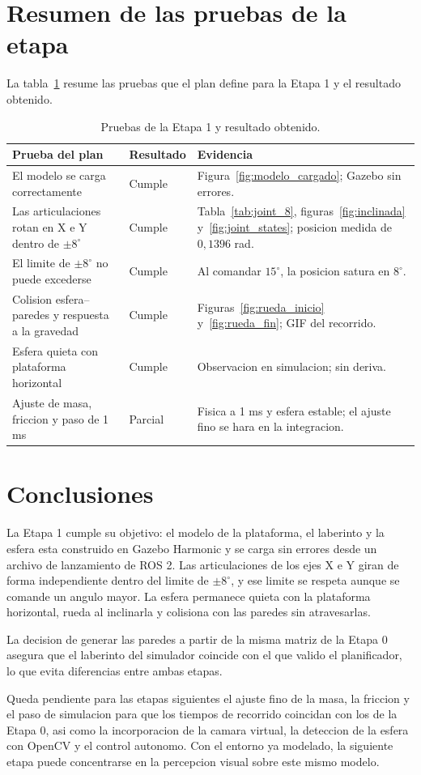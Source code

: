 \documentclass[11pt,a4paper]{article}
\begin{document}
\section{Resumen de las pruebas de la etapa}
La tabla~\ref{tab:pruebas} resume las pruebas que el plan define para la Etapa 1 y el resultado obtenido.
\begin{table}[H]
    \centering
    \begin{tabular}{@{}p{6.5cm}p{2cm}p{5.5cm}@{}}
        \toprule
        \textbf{Prueba del plan} & \textbf{Resultado} & \textbf{Evidencia} \\
        \midrule
        El modelo se carga correctamente & Cumple & Figura~\ref{fig:modelo_cargado}; Gazebo sin errores. \\
        Las articulaciones rotan en X e Y dentro de $\pm 8^\circ$ & Cumple & Tabla~\ref{tab:joint_8}, figuras~\ref{fig:inclinada} y~\ref{fig:joint_states}; posicion medida de $0{,}1396$ rad. \\
        El limite de $\pm 8^\circ$ no puede excederse & Cumple & Al comandar $15^\circ$, la posicion satura en $8^\circ$. \\
        Colision esfera--paredes y respuesta a la gravedad & Cumple & Figuras~\ref{fig:rueda_inicio} y~\ref{fig:rueda_fin}; GIF del recorrido. \\
        Esfera quieta con plataforma horizontal & Cumple & Observacion en simulacion; sin deriva. \\
        Ajuste de masa, friccion y paso de 1 ms & Parcial & Fisica a 1 ms y esfera estable; el ajuste fino se hara en la integracion. \\
        \bottomrule
    \end{tabular}
    \caption{Pruebas de la Etapa 1 y resultado obtenido.}
    \label{tab:pruebas}
\end{table}

\section{Conclusiones}
La Etapa 1 cumple su objetivo: el modelo de la plataforma, el laberinto y la esfera esta construido en Gazebo Harmonic y se carga sin errores desde un archivo de lanzamiento de ROS 2. Las articulaciones de los ejes X e Y giran de forma independiente dentro del limite de $\pm 8^\circ$, y ese limite se respeta aunque se comande un angulo mayor. La esfera permanece quieta con la plataforma horizontal, rueda al inclinarla y colisiona con las paredes sin atravesarlas.

La decision de generar las paredes a partir de la misma matriz de la Etapa 0 asegura que el laberinto del simulador coincide con el que valido el planificador, lo que evita diferencias entre ambas etapas.

Queda pendiente para las etapas siguientes el ajuste fino de la masa, la friccion y el paso de simulacion para que los tiempos de recorrido coincidan con los de la Etapa 0, asi como la incorporacion de la camara virtual, la deteccion de la esfera con OpenCV y el control autonomo. Con el entorno ya modelado, la siguiente etapa puede concentrarse en la percepcion visual sobre este mismo modelo.
\end{document}
